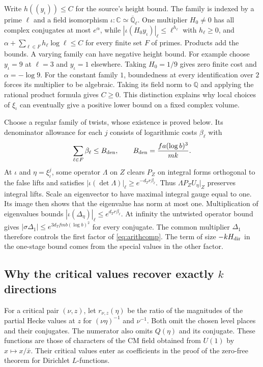 Write $h((y_\iota))\le C$ for the source's height bound. The family is indexed by a prime $\ell$ and a field isomorphism $\iota:\mathbb C\simeq\overline{\mathbb Q}_\ell$. One multiplier $H_0\ne0$ has all complex conjugates at most $e^\alpha$, while $|\iota(H_0 y_\iota)|_\ell\le\ell^{h_\ell}$ with $h_\ell\ge0$, and $\alpha+\sum_{\ell\in F}h_\ell\log\ell\le C$ for every finite set $F$ of primes. Products add the bounds. A varying family can have negative height bound. For example choose $y_\iota=9$ at $\ell=3$ and $y_\iota=1$ elsewhere. Taking $H_0=1/9$ gives zero finite cost and $\alpha=-\log9$. For the constant family $1$, boundedness at every identification over $2$ forces its multiplier to be algebraic. Taking its field norm to $\mathbb Q$ and applying the rational product formula gives $C\ge0$. This distinction explains why local choices of $\xi_\iota$ can eventually give a positive lower bound on a fixed complex volume.

Choose a regular family of twists, whose existence is proved below. Its denominator allowance for each $j$ consists of logarithmic costs $\beta_\ell$ with
\[
 \sum_{\ell\in F}\beta_\ell\le B_{\rm den},
 \qquad B_{\rm den}=\frac{fa(\log b)^3}{mk}.
\]
At $\iota$ and $\eta=\xi_\iota^j$, some operator $\Lambda$ on $Z$ clears $P_Z$ on integral forms orthogonal to the false lifts and satisfies $|\iota(\det\Lambda)|_\ell\ge e^{-d_T r\beta_\ell}$. Thus $\Lambda P_ZU_\eta|_Z$ preserves integral lifts. Scale an eigenvector to have maximal integral gauge equal to one. Its image then shows that the eigenvalue has norm at most one. Multiplication of eigenvalues bounds $|\iota(\Delta_\eta)|_\ell\le e^{d_T r\beta_\ell}$. At infinity the untwisted operator bound gives $|\sigma\Delta_1|\le e^{3d_T fmb(\log b)^2}$ for every conjugate. The common multiplier $\Delta_1$ therefore controls the first factor of \eqref{eq:arithcomp}. The term of size $-kH_{\rm dir}$ in the one-stage bound comes from the special values in the other factor.

\subsection{Why the critical values recover exactly $k$ directions}
For a critical pair $(\nu,z)$, let $r_{\nu,z}(\eta)$ be the ratio of the magnitudes of the partial Hecke values at $z$ for $(\nu\eta)^{-1}$ and $\nu^{-1}$. Both omit the chosen level places and their conjugates. The numerator also omits $Q(\eta)$ and its conjugate. These functions are those of characters of the CM field obtained from $U(1)$ by $x\mapsto x/\bar x$. Their critical values enter as coefficients in the proof of the zero-free theorem for Dirichlet $L$-functions.

